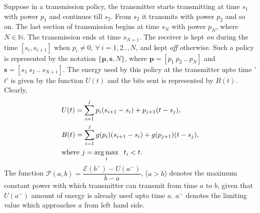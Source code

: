 Suppose in a transmission policy, the transmitter starts transmitting at time $s_1$ with power $p_1$ and continues till $s_2$. From $s_2$ it transmits with power $p_2$ and so on. The last section of transmission begins at time $s_N$ with power $p_N$, where $N\in \mathbb{N}$. The transmission ends at time $s_{N+1}$. The receiver is kept \textit{on} during the time $[s_i,s_{i+1}]$ when $p_i\ne 0$, $\forall \ i=1,2..,N$, and kept \textit{off} otherwise. Such a policy is represented by the notation $\{\textbf{p},\textbf{s},N\}$, where $\textbf{p}=[p_1\ p_2\ ..\ p_N]$ and $\textbf{s}=[s_1\ s_2\ ..\ s_{N+1}]$. The energy used by this policy at the transmitter upto time '$t$' is given by the function $U(t)$ and the bits sent is represented by $B(t)$. Clearly,
\begin{align}
&U(t)=\sum_{i=1}^{j} p_i(s_{i+1}-s_i)+p_{j+1}(t-s_j) ,
\\
&B(t)=\sum_{i=1}^{j} g(p_i)(s_{i+1}-s_i)+g(p_{j+1})(t-s_j),
\\
&\text{where }j=\operatorname*{arg\,max}_{i} \hspace{2mm}t_i<t.\nonumber
\end{align}
The function $\mathcal{P}(a,b)=\dfrac{\mathcal{E}(b^- )-U(a^- )}{b-a}$,  ($a>b$) denotes the maximum constant power with which transmitter can transmit from time $a$ to $b$, given that $U(a^- )$ amount of energy is already used upto time $a$. $a^-$ denotes the limiting value which approaches $a$ from left hand side.

